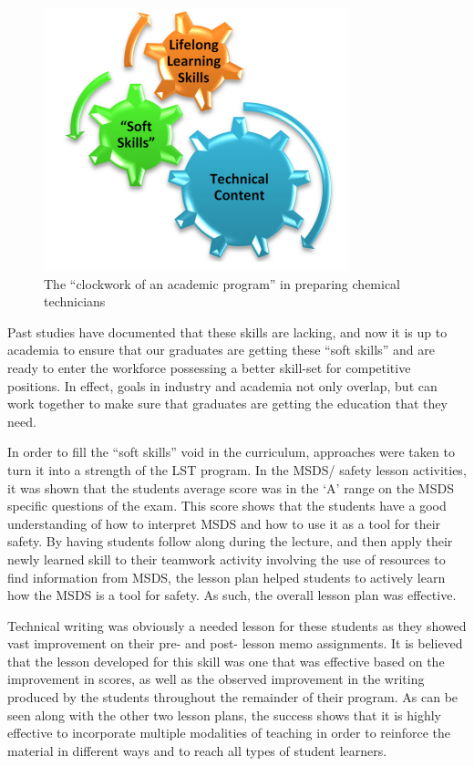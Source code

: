\documentclass[11.5pt]{sig-alternate} %
\begin{document}
\begin{large}
\begin{figure}[h]
    \centering
    \includegraphics[width=1\linewidth]{images/fig4.png}
    \caption{The “clockwork of an academic program” in preparing chemical technicians}
\end{figure}

Past studies have documented that these skills are lacking, and now it is up to academia to ensure that our graduates are getting these “soft skills” and are ready to enter the workforce possessing a better skill-set for competitive positions. In effect, goals in industry and academia not only overlap, but can work together to make sure that graduates are getting the education that they need.

In order to fill the “soft skills” void in the curriculum, approaches were taken to turn it into a strength of the LST program. In the MSDS/ safety lesson activities, it was shown that the students average score was in the ‘A’ range on the MSDS specific questions of the exam. This score shows that the students have a good understanding of how to interpret MSDS and how to use it as a tool for their safety. By having students follow along during the lecture, and then apply their newly learned skill to their teamwork activity involving the use of resources to find information from MSDS, the lesson plan helped students to actively learn how the MSDS is a tool for safety. As such, the overall lesson plan was effective.

Technical writing was obviously a needed lesson for these students as they showed vast improvement on their pre- and post- lesson memo assignments. It is believed that the lesson developed for this skill was one that was effective based on the improvement in scores, as well as the observed improvement in the writing produced by the students throughout the remainder of their program. As can be seen along with the other two lesson plans, the success shows that it is highly effective to incorporate multiple modalities of teaching in order to reinforce the material in different ways and to reach all types of student learners. 


\end{large}
\end{document}
